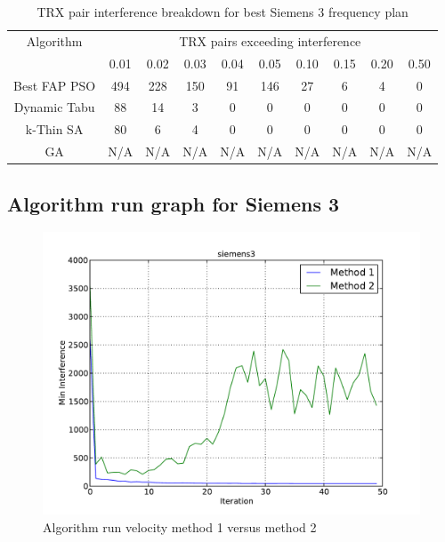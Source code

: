 \begin{table}[H]
\centering
	\begin{tabular}{cccccccccc}
	\toprule
    Algorithm & \multicolumn{9}{c}{TRX pairs exceeding interference}\\
    & 0.01 & 0.02 & 0.03 & 0.04 & 0.05 & 0.10 & 0.15 & 0.20 & 0.50 \\
    \midrule
    Best FAP PSO & 494 & 228 & 150 & 91 & 146 & 27 & 6 & 4 & 0 \\
    Dynamic Tabu & 88 & 14 & 3 & 0 & 0 & 0 & 0 & 0 & 0\\
    k-Thin SA & 80 & 6 & 4 & 0 & 0 & 0 & 0 & 0 & 0\\
    GA & \scriptsize{N/A} & \scriptsize{N/A} & \scriptsize{N/A} & \scriptsize{N/A} & \scriptsize{N/A} & \scriptsize{N/A} & \scriptsize{N/A} & \scriptsize{N/A} & \scriptsize{N/A}\\
    \bottomrule
	\end{tabular}
\caption{TRX pair interference breakdown for best Siemens 3 frequency plan}
\label{tab:breakdown-siem3m1}
\end{table}

\subsection{Algorithm run graph for Siemens 3}
\begin{figure}[H]
	\begin{centering}
    \includegraphics[scale=0.5]{../Implementation/data-cruncher/graph/Siemens3.pdf}
	\caption{Algorithm run velocity method 1 versus method 2}
	\label{fig:siem3graph}
	\end{centering}
\end{figure}




